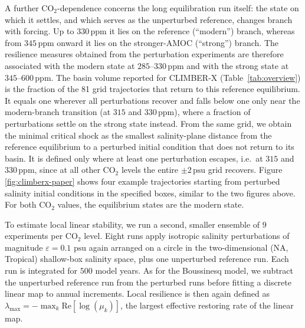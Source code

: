 \documentclass[12pt, a4paper]{article}
\newcommand{\psu}{\,\text{psu}}
\newcommand{\CO}{CO\ensuremath{_2}}
\begin{document}
A further \CO{}-dependence concerns the long equilibration run itself: the state on which it settles, and which serves as the unperturbed reference, changes branch with forcing. Up to $330\,\text{ppm}$ it lies on the reference (``modern'') branch, whereas from $345\,\text{ppm}$ onward it lies on the stronger-AMOC (``strong'') branch. The resilience measures obtained from the perturbation experiments are therefore associated with the modern state at $285$--$330\,\text{ppm}$ and with the strong state at $345$--$600\,\text{ppm}$. The basin volume reported for CLIMBER-X (Table~\ref{tab:overview}) is the fraction of the 81 grid trajectories that return to this reference equilibrium. It equals one wherever all perturbations recover and falls below one only near the modern-branch transition (at $315$ and $330\,\text{ppm}$), where a fraction of perturbations settle on the strong state instead. From the same grid, we obtain the minimal critical shock as the smallest salinity-plane distance from the reference equilibrium to a perturbed initial condition that does not return to its basin. It is defined only where at least one perturbation escapes, i.e.\ at $315$ and $330\,\text{ppm}$, since at all other \CO{} levels the entire $\pm2\psu{}$ grid recovers. Figure \ref{fig:climberx-paper} shows four example trajectories starting from perturbed salinity initial conditions in the specified boxes, similar to the two figures above. For both \CO{} values, the equilibrium states are the modern state.

To estimate local linear stability, we run a second, smaller ensemble of $9$ experiments per \CO{} level. Eight runs apply isotropic salinity perturbations of magnitude $\varepsilon = 0.1\,\psu{}$ again arranged on a circle in the two-dimensional (NA, Tropical) shallow-box salinity space, plus one unperturbed reference run. Each run is integrated for $500$ model years. As for the Boussinesq model, we subtract the unperturbed reference run from the perturbed runs before fitting a discrete linear map to annual increments. Local resilience is then again defined as $\lambda_{\max}=-\max_k\mathrm{Re}[\log(\mu_k)]$, the largest effective restoring rate of the linear map.
\end{document}
